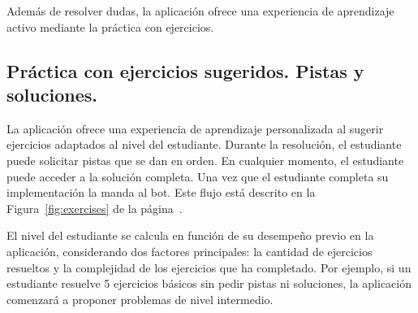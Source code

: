 Además de resolver dudas, la aplicación ofrece una experiencia de aprendizaje activo mediante la práctica con ejercicios.

\subsection{Práctica con ejercicios sugeridos. Pistas y soluciones.}

La aplicación ofrece una experiencia de aprendizaje personalizada al sugerir ejercicios adaptados al nivel del estudiante. Durante la resolución, el estudiante puede solicitar pistas que se dan en orden. En cualquier momento, el estudiante puede acceder a la solución completa. Una vez que el estudiante completa su implementación la manda al bot. Este flujo está descrito en la Figura~\ref{fig:exercises} de la página~\pageref{fig:exercises}.

El nivel del estudiante se calcula en función de su desempeño previo en la aplicación, considerando dos factores principales: la cantidad de ejercicios resueltos y la complejidad de los ejercicios que ha completado. Por ejemplo, si un estudiante resuelve 5 ejercicios básicos sin pedir pistas ni soluciones, la aplicación comenzará a proponer problemas de nivel intermedio.

